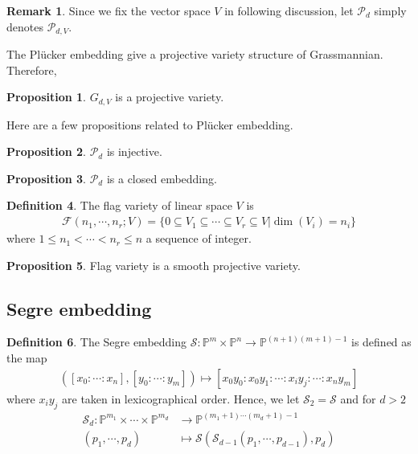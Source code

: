 \documentclass[10pt,UTF8]{article}
\theoremstyle{definition}
\newtheorem{definition}{Definition}[section]
\newtheorem{proposition}[definition]{Proposition}
\newtheorem*{remark}{Remark}
\begin{document}
\begin{remark}
  Since we fix the vector space $V$ in following discussion, let $\mathcal{P}_d$ simply denotes $\mathcal{P}_{d,V}$.
\end{remark}

The Plücker embedding give a projective variety structure of Grassmannian. Therefore,
\begin{proposition}
  ${G}_{d,V}$ is a projective variety.
\end{proposition}


Here are a few propositions related to Plücker embedding.
\begin{proposition}
  $\mathcal{P}_d$ is injective. \label{2}
\end{proposition}

\begin{proposition}
  $\mathcal{P}_d$ is a closed embedding.
\end{proposition}

\begin{definition}
  The flag variety of linear space $V$ is 
  \begin{align*}
    \mathcal{F}(n_1,\cdots,n_r; V) = \{0\subseteq V_1 \subseteq \cdots \subseteq V_r \subseteq V|\dim(V_i) = n_i\}
  \end{align*}
  where $1\le n_1<\cdots<n_r\le n$ a sequence of integer.
\end{definition}
\begin{proposition}
  Flag variety is a smooth projective variety. \label{fv}
\end{proposition}


\subsection{Segre embedding}
\begin{definition}
  The Segre embedding $ \mathscr{S}: \mathbb{P}^m \times \mathbb{P}^n \to \mathbb{P}^{(n+1)(m+1)-1}$ is defined as the map
  \begin{align*}
    ([x_0:\cdots:x_n],[y_0:\cdots:y_m]) \mapsto [x_0y_0:x_0y_1:\cdots:x_iy_j:\cdots:x_ny_m]
  \end{align*}
  where $x_iy_j$ are taken in lexicographical order. Hence, we let $\mathscr{S}_2= \mathscr{S}$ and for $d>2$
  \begin{align*}
    \mathscr{S}_d:\mathbb{P}^{m_1}\times\cdots\times \mathbb{P}^{m_d} &\to \mathbb{P}^{(m_1+1)\cdots(m_d+1)-1}\\
    (p_1, \cdots ,p_d) &\mapsto \mathscr{S}(\mathscr{S}_{d-1}(p_1,\cdots,p_{d-1}),p_d)
  \end{align*}
\end{definition}
\end{document}
